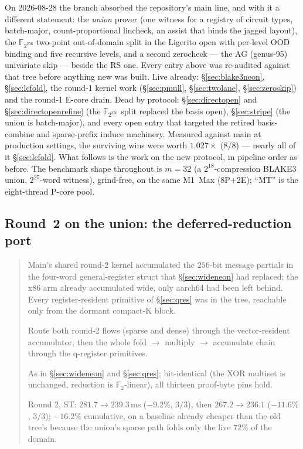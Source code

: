 \documentclass[11pt]{article}
\newcommand{\Ftwo}{\mathbb{F}_2}
\newenvironment{optsummary}{%
  \begin{quote}\small
  \begin{description}
  \setlength{\itemsep}{1pt}\setlength{\parsep}{0pt}\setlength{\topsep}{2pt}
}{%
  \end{description}
  \end{quote}
}
\begin{document}
On 2026-08-28 the branch absorbed the repository's main line, and with
it a different statement: the \emph{union} prover (one witness for a
registry of circuit types, batch-major, count-proportional lincheck,
an assist that binds the jagged layout), the $\mathbb{F}_{2^{256}}$
two-point out-of-domain split in the Ligerito open with per-level
OOD binding and five recursive levels, and a second zerocheck --- the
AG (genus-95) univariate skip --- beside the RS one. Every entry above
was re-audited against that tree before anything new was built. Live
already: \S\ref{sec:blake3neon}, \S\ref{sec:lcfold}, the round-1 kernel
work (\S\ref{sec:pmull}, \S\ref{sec:twolane}, \S\ref{sec:zeroskip}) and
the round-1 E-core drain. Dead by protocol: \S\ref{sec:directopen} and
\S\ref{sec:directopenrefine} (the $\mathbb{F}_{2^{256}}$ split replaced
the basis open), \S\ref{sec:stripe} (the union is batch-major), and
every open entry that targeted the retired basis-combine and
sparse-prefix induce machinery. Measured against main at production
settings, the surviving wins were worth $1.027\times$ ($8/8$) --- nearly
all of it \S\ref{sec:lcfold}. What follows is the work on the new
protocol, in pipeline order as before. The benchmark shape throughout
is $m{=}32$ (a $2^{18}$-compression BLAKE3 union, $2^{25}$-word
witness), grind-free, on the same M1~Max (8P+2E); ``MT'' is the
eight-thread P-core pool.

\subsection{Round~2 on the union: the deferred-reduction port}\label{sec:r2union}

\begin{optsummary}
\item[Baseline:] Main's shared round-2 kernel accumulated the $256$-bit message partials in the four-word general-register struct that \S\ref{sec:wideneon} had replaced; the x86 arm already accumulated wide, only aarch64 had been left behind. Every register-resident primitive of \S\ref{sec:qres} was in the tree, reachable only from the dormant compact-K block.
\item[Improvement:] Route both round-2 flows (sparse and dense) through the vector-resident accumulator, then the whole fold $\to$ multiply $\to$ accumulate chain through the q-register primitives.
\item[Mechanism:] As in \S\ref{sec:wideneon} and \S\ref{sec:qres}; bit-identical (the XOR multiset is unchanged, reduction is $\Ftwo$-linear), all thirteen proof-byte pins hold.
\item[Result:] Round 2, ST: $281.7\to239.3\,$ms ($-9.2\%$, $3/3$), then $267.2\to236.1$ ($-11.6\%$, $3/3$); $-16.2\%$ cumulative, on a baseline already cheaper than the old tree's because the union's sparse path folds only the live $72\%$ of the domain.
\end{optsummary}
\end{document}
